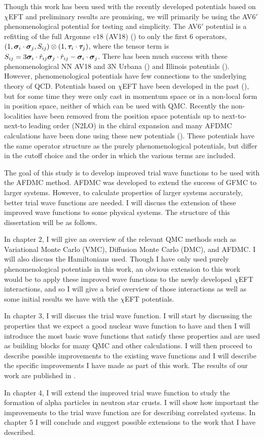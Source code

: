Though this work has been used with the recently developed potentials based on $\chi$EFT and preliminary results are promising, we will primarily be using the AV6$'$ phenomenological potential for testing and simplicity. The AV6$'$ potential is a refitting of the full Argonne $v18$ (AV18) (\cite{wiringa1995}) to only the first 6 operators, $(1,\bm{\sigma}_i\cdot\bm{\sigma}_j,S_{ij})\otimes(1,\bm{\tau}_i\cdot\bm{\tau}_j)$, where the tensor term is $S_{ij} = 3\bm{\sigma}_i\cdot\hat{r}_{ij}\bm{\sigma}_j\cdot\hat{r}_{ij}-\bm{\sigma}_i\cdot\bm{\sigma}_j$. There has been much success with these phenomenological NN AV18 and 3N Urbana (\cite{carlson1983}) and Illinois potentials (\cite{pieper2001}). However, phenomenological potentials have few connections to the underlying theory of QCD. Potentials based on $\chi$EFT have been developed in the past (\cite{epelbaum2009}), but for some time they were only cast in momentum space or in a non-local form in position space, neither of which can be used with QMC. Recently the non-localities have been removed from the position space potentials up to next-to-next-to leading order (N2LO) in the chiral expansion and many AFDMC calculations have been done using these new potentials (\cite{gezerlis2013}). These potentials have the same operator structure as the purely phenomenological potentials, but differ in the cutoff choice and the order in which the various terms are included.

The goal of this study is to develop improved trial wave functions to be used with the AFDMC method. AFDMC was developed to extend the success of GFMC to larger systems. However, to calculate properties of larger systems accurately, better trial wave functions are needed. I will discuss the extension of these improved wave functions to some physical systems. The structure of this dissertation will be as follows.

In chapter 2, I will give an overview of the relevant QMC methods such as Variational Monte Carlo (VMC), Diffusion Monte Carlo (DMC), and AFDMC. I will also discuss the Hamiltonians used. Though I have only used purely phenomenological potentials in this work, an obvious extension to this work would be to apply these improved wave functions to the newly developed $\chi$EFT interactions, and so I will give a brief overview of those interactions as well as some initial results we have with the $\chi$EFT potentials.

In chapter 3, I will discuss the trial wave function. I will start by discussing the properties that we expect a good nuclear wave function to have and then I will introduce the most basic wave functions that satisfy these properties and are used as building blocks for many QMC and other calculations. I will then proceed to describe possible improvements to the existing wave functions and I will describe the specific improvements I have made as part of this work. The results of our work are published in \cite{lonardoni2018}.

In chapter 4, I will extend the improved trial wave function to study the formation of alpha particles in neutron star crusts. I will show how important the improvements to the trial wave function are for describing correlated systems. In chapter 5 I will conclude and suggest possible extensions to the work that I have described.
